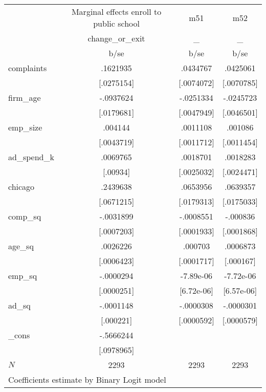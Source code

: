 \begin{tabular}{l*{3}{c}}
            &\multicolumn{1}{c}{Marginal effects enroll to public school}&\multicolumn{1}{c}{m51}&\multicolumn{1}{c}{m52}\\
            &change\_or\_exit&           \_&           \_\\
            &        b/se&        b/se&        b/se\\
complaints  &    .1621935&    .0434767&    .0425061\\
            &  [.0275154]&  [.0074072]&  [.0070785]\\
firm\_age    &   -.0937624&   -.0251334&   -.0245723\\
            &  [.0179681]&  [.0047949]&  [.0046501]\\
emp\_size    &     .004144&    .0011108&     .001086\\
            &  [.0043719]&  [.0011712]&  [.0011454]\\
ad\_spend\_k  &    .0069765&    .0018701&    .0018283\\
            &    [.00934]&  [.0025032]&  [.0024471]\\
chicago     &    .2439638&    .0653956&    .0639357\\
            &  [.0671215]&  [.0179313]&  [.0175033]\\
comp\_sq     &   -.0031899&   -.0008551&    -.000836\\
            &  [.0007203]&  [.0001933]&  [.0001868]\\
age\_sq      &    .0026226&     .000703&    .0006873\\
            &  [.0006423]&  [.0001717]&   [.000167]\\
emp\_sq      &   -.0000294&   -7.89e-06&   -7.72e-06\\
            &  [.0000251]&  [6.72e-06]&  [6.57e-06]\\
ad\_sq       &   -.0001148&   -.0000308&   -.0000301\\
            &   [.000221]&  [.0000592]&  [.0000579]\\
\_cons      &   -.5666244&            &            \\
            &  [.0978965]&            &            \\
\(N\)       &        2293&        2293&        2293\\
\multicolumn{4}{l}{\footnotesize Coefficients estimate by Binary Logit model}\\
\end{tabular}
